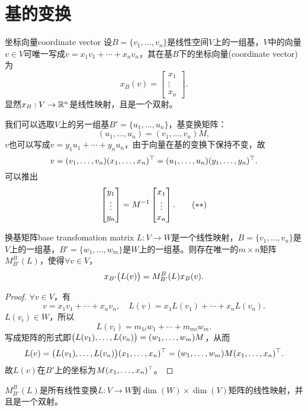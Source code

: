 \section{基的变换}
\begin{definition}{坐标向量}{coordinate vector}
	设$B=\{v_1,\ldots,v_n\}$是线性空间$V$上的一组基，$V$中的向量$v\in V$可唯一写成$v=x_1v_1+\cdots+x_nv_n$，其在基$B$下的坐标向量(coordinate vector)为
	\[
		x_B(v)=\begin{bmatrix}
			x_1\\\vdots\\x_n
		\end{bmatrix}.
	\]
	显然$x_B:V\to\mathbb R^n$是线性映射，且是一个双射。
\end{definition}
我们可以选取$V$上的另一组基$B'=\{u_1,\ldots,u_n\}$，基变换矩阵：
\[
	(u_1,\ldots,u_n)=(v_1,\ldots,v_n)M,\tag{$\ast$}
\]
$v$也可以写成$v=y_1u_1+\cdots+y_nu_n$，由于向量在基的变换下保持不变，故
\[
	v=(v_1,\ldots,v_n)(x_1,\ldots,x_n)^\top=(u_1,\ldots,u_n)(y_1,\ldots,y_n)^\top.
\]
可以推出
\[
	\begin{bmatrix}
		y_1\\\vdots\\y_n
	\end{bmatrix}=M^{-1}\begin{bmatrix}
		x_1\\\vdots\\x_n
	\end{bmatrix}.\tag{$\ast\ast$}
\]
\begin{theorem}{换基矩阵}{base transfomation matrix}
	$L:V\to W$是一个线性映射，$B=\{v_1,\ldots,v_n\}$是$V$上的一组基，$B'=\{w_1,\ldots,w_m\}$是$W$上的一组基。则存在唯一的$m\times n$矩阵$M_{B'}^B(L)$，使得$\forall v\in V$，
	\[
		x_{B'}\bigl(L(v)\bigr)=M_{B'}^B(L)x_B(v).
	\]
\end{theorem}
\begin{proof}
	$\forall v\in V$，有
	\[
		v=x_1v_1+\cdots+x_nv_n,\quad L(v)=x_1L(v_1)+\cdots+x_nL(v_n).
	\]
	$L(v_i)\in W$，所以
	\[
		L(v_i)=m_{1i}w_1+\cdots+m_{mi}w_m.
	\]
	写成矩阵的形式即$\bigl(L(v_1),\ldots,L(v_n)\bigr)=(w_1,\ldots,w_m)M$，从而
	\[
		L(v)=\bigl(L(v_1),\ldots,L(v_n)\bigr)(x_1,\ldots,x_n)^\top=(w_1,\ldots,w_m)M(x_1,\ldots,x_n)^\top.
	\]
	故$L(v)$在$B'$上的坐标为$M(x_1,\ldots,x_n)^\top$。
\end{proof}

$M_{B'}^B(L)$是所有线性变换$L:V\to W$到$\dim(W)\times\dim(V)$矩阵的线性映射，并且是一个双射。

